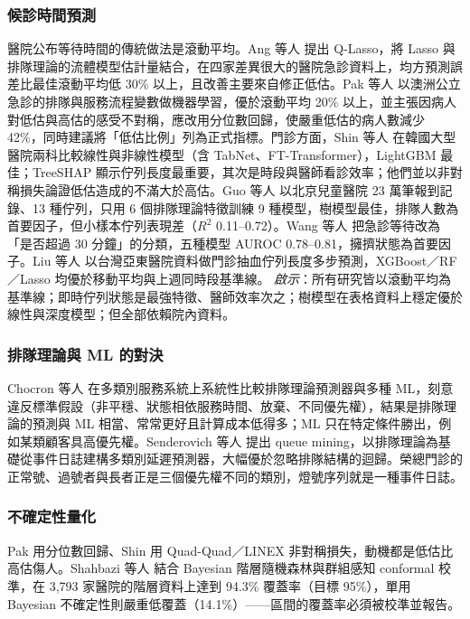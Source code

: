 \documentclass[11pt,twocolumn]{article}
\begin{document}
\subsubsection{候診時間預測}
醫院公布等待時間的傳統做法是滾動平均。Ang 等人 \cite{ang2016} 提出 Q-Lasso，將 Lasso 與排隊理論的流體模型估計量結合，在四家差異很大的醫院急診資料上，均方預測誤差比最佳滾動平均低 30\% 以上，且改善主要來自修正低估。Pak 等人 \cite{pak2021} 以澳洲公立急診的排隊與服務流程變數做機器學習，優於滾動平均 20\% 以上，並主張因病人對低估與高估的感受不對稱，應改用分位數回歸，使嚴重低估的病人數減少 42\%，同時建議將「低估比例」列為正式指標。門診方面，Shin 等人 \cite{shin2024} 在韓國大型醫院兩科比較線性與非線性模型（含 TabNet、FT-Transformer），LightGBM 最佳；TreeSHAP 顯示佇列長度最重要，其次是時段與醫師看診效率；他們並以非對稱損失論證低估造成的不滿大於高估。Guo 等人 \cite{guo2025} 以北京兒童醫院 23 萬筆報到記錄、13 種佇列，只用 6 個排隊理論特徵訓練 9 種模型，樹模型最佳，排隊人數為首要因子，但小樣本佇列表現差（$R^2$ 0.11--0.72）。Wang 等人 \cite{wang2025} 把急診等待改為「是否超過 30 分鐘」的分類，五種模型 AUROC 0.78--0.81，擁擠狀態為首要因子。Liu 等人 \cite{liu2026} 以台灣亞東醫院資料做門診抽血佇列長度多步預測，XGBoost／RF／Lasso 均優於移動平均與上週同時段基準線。
\textit{啟示}：所有研究皆以滾動平均為基準線；即時佇列狀態是最強特徵、醫師效率次之；樹模型在表格資料上穩定優於線性與深度模型；但全部依賴院內資料。

\subsubsection{排隊理論與 ML 的對決}
Chocron 等人 \cite{chocron2022} 在多類別服務系統上系統性比較排隊理論預測器與多種 ML，刻意違反標準假設（非平穩、狀態相依服務時間、放棄、不同優先權），結果是排隊理論的預測與 ML 相當、常常更好且計算成本低得多；ML 只在特定條件勝出，例如某類顧客具高優先權。Senderovich 等人 \cite{senderovich2015} 提出 queue mining，以排隊理論為基礎從事件日誌建構多類別延遲預測器，大幅優於忽略排隊結構的迴歸。榮總門診的正常號、過號者與長者正是三個優先權不同的類別，燈號序列就是一種事件日誌。

\subsubsection{不確定性量化}
Pak \cite{pak2021} 用分位數回歸、Shin \cite{shin2024} 用 Quad-Quad／LINEX 非對稱損失，動機都是低估比高估傷人。Shahbazi 等人 \cite{shahbazi2026} 結合 Bayesian 階層隨機森林與群組感知 conformal 校準，在 3,793 家醫院的階層資料上達到 94.3\% 覆蓋率（目標 95\%），單用 Bayesian 不確定性則嚴重低覆蓋（14.1\%）——區間的覆蓋率必須被校準並報告。
\end{document}
